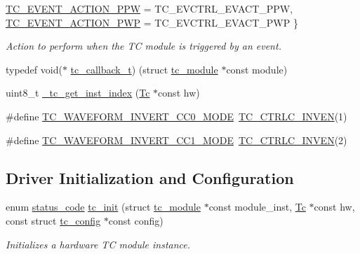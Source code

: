 \begin{DoxyCompactItemize}
\newline
\mbox{\hyperlink{group__asfdoc__sam0__tc__group_gga4dcbf6cdb74bc3b7609ce8d16549462fa4957024d607401030b128f9b775edb7d}{T\+C\+\_\+\+E\+V\+E\+N\+T\+\_\+\+A\+C\+T\+I\+O\+N\+\_\+\+P\+PW}} = T\+C\+\_\+\+E\+V\+C\+T\+R\+L\+\_\+\+E\+V\+A\+C\+T\+\_\+\+P\+PW, 
\mbox{\hyperlink{group__asfdoc__sam0__tc__group_gga4dcbf6cdb74bc3b7609ce8d16549462face22a0756d93b16a9b70511fe226a893}{T\+C\+\_\+\+E\+V\+E\+N\+T\+\_\+\+A\+C\+T\+I\+O\+N\+\_\+\+P\+WP}} = T\+C\+\_\+\+E\+V\+C\+T\+R\+L\+\_\+\+E\+V\+A\+C\+T\+\_\+\+P\+WP
 \}
\begin{DoxyCompactList}\small\item\em Action to perform when the TC module is triggered by an event. \end{DoxyCompactList}\item 
typedef void($\ast$ \mbox{\hyperlink{group__asfdoc__sam0__tc__group_ga2a1d57f42085001f29a6584ae8ab1bb4}{tc\+\_\+callback\+\_\+t}}) (struct \mbox{\hyperlink{structtc__module}{tc\+\_\+module}} $\ast$const module)
\item 
uint8\+\_\+t \mbox{\hyperlink{group__asfdoc__sam0__tc__group_ga077a238b03327682013a0bceb4fc44b2}{\+\_\+tc\+\_\+get\+\_\+inst\+\_\+index}} (\mbox{\hyperlink{union_tc}{Tc}} $\ast$const hw)
\item 
\#define \mbox{\hyperlink{group__asfdoc__sam0__tc__group_ga50cb4d965dd6d607839abb71b3f034c0}{T\+C\+\_\+\+W\+A\+V\+E\+F\+O\+R\+M\+\_\+\+I\+N\+V\+E\+R\+T\+\_\+\+C\+C0\+\_\+\+M\+O\+DE}}~\mbox{\hyperlink{group___s_a_m_d21___t_c_gabcaa416dc792b45f9ea315455d3ab4c0}{T\+C\+\_\+\+C\+T\+R\+L\+C\+\_\+\+I\+N\+V\+EN}}(1)
\item 
\#define \mbox{\hyperlink{group__asfdoc__sam0__tc__group_gae194715d12d4faa15f1d1b8555bf5b53}{T\+C\+\_\+\+W\+A\+V\+E\+F\+O\+R\+M\+\_\+\+I\+N\+V\+E\+R\+T\+\_\+\+C\+C1\+\_\+\+M\+O\+DE}}~\mbox{\hyperlink{group___s_a_m_d21___t_c_gabcaa416dc792b45f9ea315455d3ab4c0}{T\+C\+\_\+\+C\+T\+R\+L\+C\+\_\+\+I\+N\+V\+EN}}(2)
\end{DoxyCompactItemize}
\subsection*{Driver Initialization and Configuration}
\begin{DoxyCompactItemize}
\item 
enum \mbox{\hyperlink{group__group__sam0__utils__status__codes_ga751c892e5a46b8e7d282085a5a5bf151}{status\+\_\+code}} \mbox{\hyperlink{group__asfdoc__sam0__tc__group_ga98c7f5c97436c2f6cff87a0261597337}{tc\+\_\+init}} (struct \mbox{\hyperlink{structtc__module}{tc\+\_\+module}} $\ast$const module\+\_\+inst, \mbox{\hyperlink{union_tc}{Tc}} $\ast$const hw, const struct \mbox{\hyperlink{structtc__config}{tc\+\_\+config}} $\ast$const config)
\begin{DoxyCompactList}\small\item\em Initializes a hardware TC module instance. \end{DoxyCompactList}\end{DoxyCompactItemize}
